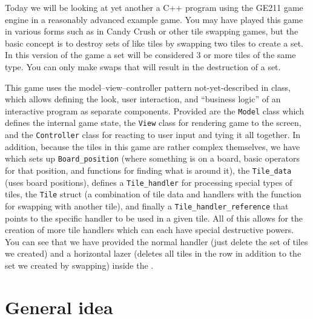 \documentclass{tufte-handout}
\begin{document}
\maketitle

Today we will be looking at yet another a C++ program using the GE211 game
engine in a reasonably advanced example game. You may have played this game
in various forms such as in Candy Crush or other tile swapping games, but the
basic concept is to destroy sets of like tiles by swapping two tiles to
create a set. In this version of the game a set will be considered 3 or more
tiles of the same type. You can only make swaps that will result in the
destruction of a set.

This game uses the model--view--controller pattern not-yet-described in
class, which allows defining the look, user interaction, and ``business
logic'' of an interactive program as separate components. Provided are
the \texttt{Model} class which defines the internal game state, the
\texttt{View} class for rendering game to the screen, and the
\texttt{Controller} class for reacting to user input and tying it all
together. In addition, because the tiles in this game are rather complex
themselves, we have  which sets up \texttt{Board\_position}
(where something is on a board, basic operators for that position, and
functions for finding what is around it), the \texttt{Tile\_data} (uses board
positions), defines a \texttt{Tile\_handler} for processing special types of
tiles, the \texttt{Tile} struct (a combination of tile data and handlers with
the function for swapping with another tile), and finally a
\texttt{Tile\_handler\_reference} that points to the specific handler to be
used in a given tile. All of this allows for the creation of more tile handlers
which can each have special destructive powers. You can see that we have provided
the normal handler (just delete the set of tiles we created) and a horizontal
lazer (deletes all tiles in the row in addition to the set we created by swapping)
inside the .

\CxxPrelims

\section{General idea}
\end{document}
